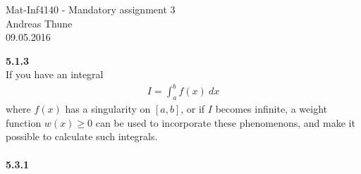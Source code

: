 \documentclass[11pt,a4paper]{report}
\begin{document}
\begin{center}

\LARGE Mat-Inf4140 - Mandatory assignment 3
\\
Andreas Thune
\\
\LARGE
09.05.2016

\end{center}
\textbf{5.1.3}
\\
If you have an integral 
\begin{align*}
I=\int_a^b f(x) \ dx
\end{align*}
where $f(x)$ has a singularity  on $[a,b]$, or if $I$ becomes infinite, a weight function $w(x)\geq0$ can be used to incorporate these phenomenons, and make it possible to calculate such integrals.
\\
\\  
\textbf{5.3.1}
\\
\end{document}

